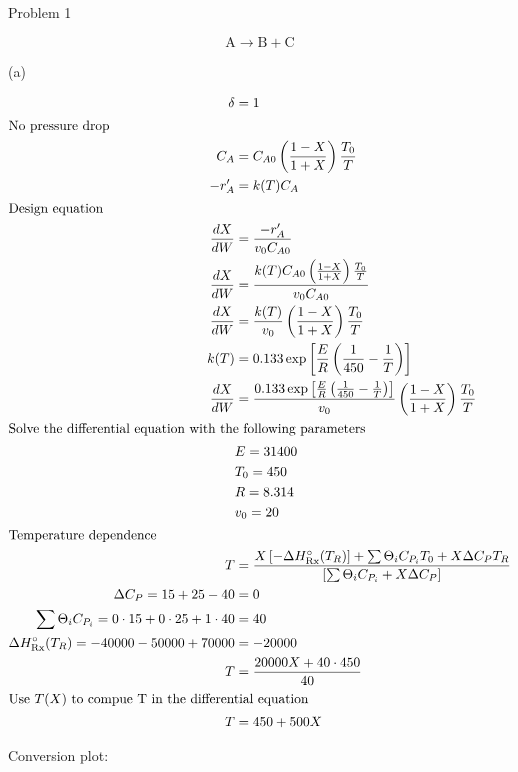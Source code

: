 \item Problem 1

\[
    \mathrm{A} \rightarrow \mathrm{B} + \mathrm{C}
\]

(a)

\begin{align*}
    \delta &= 1 \\
    \intertext{No pressure drop}
    C_A &= C_{A0} \left(\frac{1 - X}{1 + X}\right) \frac{T_0}{T} \\
    -r_A' &= k(T) C_A \\
    \intertext{Design equation}
    \frac{dX}{dW} &= \frac{-r_A'}{v_0 C_{A0}} \\
    \frac{dX}{dW} &= \frac{k(T) C_{A0} \left(\frac{1 - X}{1 + X}\right) \frac{T_0}{T}}{v_0 C_{A0}} \\
    \frac{dX}{dW} &= \frac{k(T)}{v_0} \left(\frac{1 - X}{1 + X}\right) \frac{T_0}{T} \\
    k(T) &= 0.133 \exp\left[\frac{E}{R}\left(\frac{1}{450} - \frac{1}{T}\right)\right] \\
    \frac{dX}{dW} &= \frac{0.133 \exp\left[\frac{E}{R}\left(\frac{1}{450} - \frac{1}{T}\right)\right]}{v_0} \left(\frac{1 - X}{1 + X}\right) \frac{T_0}{T} \\
    \intertext{Solve the differential equation with the following parameters}
    & E = 31400 \\
    & T_0 = 450 \\
    & R = 8.314 \\
    & v_0 = 20 \\
    \intertext{Temperature dependence}
    T &= \frac{X \left[-\Delta H_{\text{Rx}}^\circ(T_R)\right] + \sum\Theta_iC_{P_i}T_0 + X\Delta C_P T_R}{\left[\sum\Theta_iC_{P_i} +  X\Delta C_P\right]} \\
    \Delta C_P = 15 + 25 - 40 &= 0 \\
    \sum\Theta_iC_{P_i} = 0 \cdot 15 + 0 \cdot 25 + 1 \cdot 40 &= 40 \\
    \Delta H_{\text{Rx}}^\circ(T_R) = -40000 - 50000 + 70000 &= -20000 \\
    T &= \frac{20000X + 40 \cdot 450}{40} \\
    \intertext{Use $T(X)$ to compue T in the differential equation}
    T &= 450 + 500X
\end{align*}

Conversion plot:

\begin{center}
    
\end{center}


